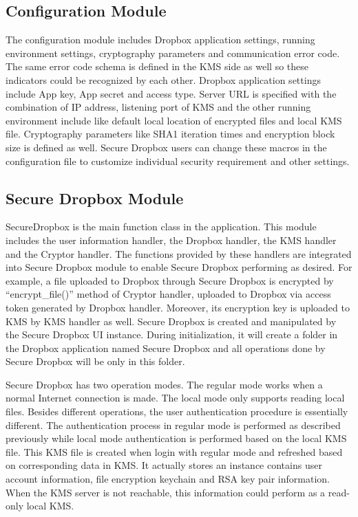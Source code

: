 \subsection{Configuration Module}

The configuration module includes Dropbox application settings, running environment settings, cryptography parameters and communication error code. The same error code schema is defined in the KMS side as well so these indicators could be recognized by each other. Dropbox application settings include App key, App secret and access type. Server URL is specified with the combination of IP address, listening port of KMS and the other running environment include like default local location of encrypted files and local KMS file. Cryptography parameters like SHA1 iteration times and encryption block size is defined as well. Secure Dropbox users can change these macros in the configuration file to customize individual security requirement and other settings.

\subsection{Secure Dropbox Module}

SecureDropbox is the main function class in the application. This module includes the user information handler, the Dropbox handler, the KMS handler and the Cryptor handler. The functions provided by these handlers are integrated into Secure Dropbox module to enable Secure Dropbox performing as desired. For example, a file uploaded to Dropbox through Secure Dropbox is encrypted by ``encrypt\_file()'' method of Cryptor handler, uploaded to Dropbox via access token generated by Dropbox handler. Moreover, its encryption key is uploaded to KMS by KMS handler as well. Secure Dropbox is created and manipulated by the Secure Dropbox UI instance. During initialization, it will create a folder in the Dropbox application named Secure Dropbox and all operations done by Secure Dropbox will be only in this folder.

Secure Dropbox has two operation modes. The regular mode works when a normal Internet connection is made. The local mode only supports reading local files. Besides different operations, the user authentication procedure is essentially different. The authentication process in regular mode is performed as described previously while local mode authentication is performed based on the local KMS file. This KMS file is created when login with regular mode and refreshed based on corresponding data in KMS. It actually stores an instance contains user account information, file encryption keychain and RSA key pair information. When the KMS server is not reachable, this information could perform as a read-only local KMS.

